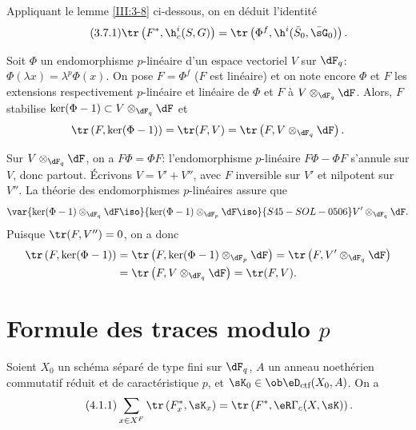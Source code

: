 Appliquant le lemme \ref{III:3-8} ci-dessous, on en déduit l'identité 
\begin{equation*}\tag{3.7.1}\label{III:eq:3-7-1}
  \tr\left(F^*,\h_c^i(S,G)\right) = \tr\left(\Phi^f,\h^i(\bar S_0,\bar\sG_0)\right) \text{.}
\end{equation*}





\begin{lemma_}\label{III:3-8}
Soit $\Phi$ un endomorphisme $p$-linéaire d'un espace vectoriel $V$ sur 
$\dF_q$: $\Phi(\lambda x) = \lambda^p\Phi(x)$. On pose $F=\Phi^f$ ($F$ est 
linéaire) et on note encore $\Phi$ et $F$ les extensions respectivement 
$p$-linéaire et linéaire de $\Phi$ et $F$ à $V\otimes_{\dF_q}\dF$. Alors, $F$ stabilise 
$\ker(\Phi-1)\subset V\otimes_{\dF_q}\dF$ et 
\[
  \tr\left(F,\ker(\Phi-1)\right) = \tr(F,V) = \tr\left(F,V\otimes_{\dF_q}\dF\right) \text{.}
\]
\end{lemma_}

Sur $V\otimes_{\dF_q}\dF$, on a $F\Phi = \Phi F$: l'endomorphisme $p$-linéaire 
$F\Phi-\Phi F$ s'annule sur $V$, donc partout. Écrivons $V=V'+V''$, avec $F$ 
inversible sur $V'$ et nilpotent sur $V''$. La théorie des endomorphismes 
$p$-linéaires assure que 
\[
  \var{\ker(\Phi-1)\otimes_{\dF_q}\dF \iso}{\ker(\Phi-1)\otimes_{\dF_p}\dF \iso}{S45-SOL-0506} V'\otimes_{\dF_q}\dF \text{.}
\]
Puisque $\tr(F,V'') = 0$, on a donc 
\begin{align*}
  \tr\left(F,\ker(\Phi-1)\right) 
    &= \tr\left(F,\ker(\Phi-1)\otimes_{\dF_p}\dF\right) = \tr\left(F,V'\otimes_{\dF_q}\dF\right) \\
    &= \tr\left(F,V\otimes_{\dF_q}\dF\right) = \tr(F,V) \text{.}
\end{align*}










\section{Formule des traces modulo \texorpdfstring{$p$}{p}}\label{III:4}





\begin{theorem_}\label{III:4-1}
Soient $X_0$ un schéma séparé de type fini sur $\dF_q$, $A$ un anneau 
noethérien commutatif réduit et de caractéristique $p$, et 
$\sK_0\in\ob\eD_\textnormal{ctf}(X_0,A)$. On a 
\begin{equation*}\tag{4.1.1}\label{III:eq:4-1-1}
  \sum_{x\in X^F} \tr\left(F_x^*,\sK_x\right) = \tr\left(F^*,\eR\Gamma_c(X,\sK)\right) \text{.}
\end{equation*}
\end{theorem_}





